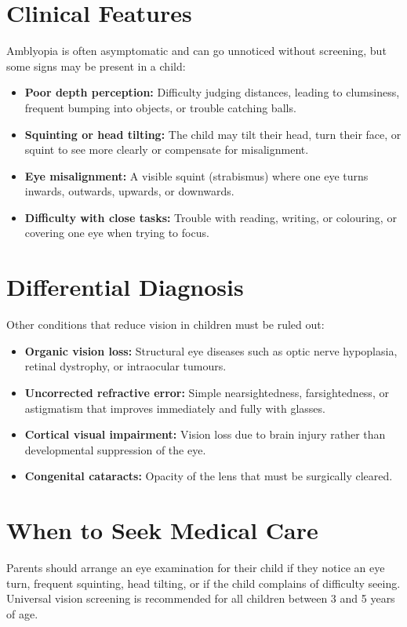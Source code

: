 \section*{Clinical Features}
Amblyopia is often asymptomatic and can go unnoticed without screening, but some signs may be present in a child:

\begin{itemize}
    \item \textbf{Poor depth perception:} Difficulty judging distances, leading to clumsiness, frequent bumping into objects, or trouble catching balls.
    \item \textbf{Squinting or head tilting:} The child may tilt their head, turn their face, or squint to see more clearly or compensate for misalignment.
    \item \textbf{Eye misalignment:} A visible squint (strabismus) where one eye turns inwards, outwards, upwards, or downwards.
    \item \textbf{Difficulty with close tasks:} Trouble with reading, writing, or colouring, or covering one eye when trying to focus.
\end{itemize}

\section*{Differential Diagnosis}
Other conditions that reduce vision in children must be ruled out:

\begin{itemize}
    \item \textbf{Organic vision loss:} Structural eye diseases such as optic nerve hypoplasia, retinal dystrophy, or intraocular tumours.
    \item \textbf{Uncorrected refractive error:} Simple nearsightedness, farsightedness, or astigmatism that improves immediately and fully with glasses.
    \item \textbf{Cortical visual impairment:} Vision loss due to brain injury rather than developmental suppression of the eye.
    \item \textbf{Congenital cataracts:} Opacity of the lens that must be surgically cleared.
\end{itemize}

\section*{When to Seek Medical Care}
Parents should arrange an eye examination for their child if they notice an eye turn, frequent squinting, head tilting, or if the child complains of difficulty seeing. Universal vision screening is recommended for all children between 3 and 5 years of age.

